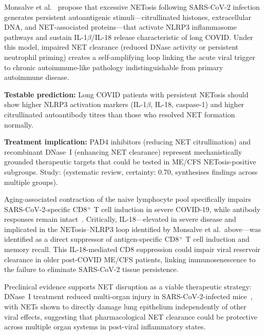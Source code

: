 \begin{hypothesis}
\label{hyp:monsalve2025-nets-autoimmunity}
Monsalve et al.~\cite{Monsalve2025} propose that excessive NETosis following SARS-CoV-2 infection generates persistent autoantigenic stimuli---citrullinated histones, extracellular DNA, and NET-associated proteins---that activate NLRP3 inflammasome pathways and sustain IL-1$\beta$/IL-18 release characteristic of long COVID. Under this model, impaired NET clearance (reduced DNase activity or persistent neutrophil priming) creates a self-amplifying loop linking the acute viral trigger to chronic autoimmune-like pathology indistinguishable from primary autoimmune disease.

\textbf{Testable prediction:} Long COVID patients with persistent NETosis should show higher NLRP3 activation markers (IL-1$\beta$, IL-18, caspase-1) and higher citrullinated autoantibody titres than those who resolved NET formation normally.

\textbf{Treatment implication:} PAD4 inhibitors (reducing NET citrullination) and recombinant DNase~I (enhancing NET clearance) represent mechanistically grounded therapeutic targets that could be tested in ME/CFS NETosis-positive subgroups.
Study: (systematic review, certainty: 0.70, synthesises findings across multiple groups).
\end{hypothesis}

Aging-associated contraction of the naive lymphocyte pool specifically impairs
SARS-CoV-2-specific CD8$^+$ T cell induction in severe COVID-19, while antibody
responses remain intact~\cite{Autaa2025CD8Aging}. Critically, IL-18---elevated in
severe disease and implicated in the NETosis--NLRP3 loop identified by Monsalve et al.\ above---was
identified as a direct suppressor of antigen-specific CD8$^+$ T cell induction and
memory recall. This IL-18-mediated CD8 suppression could impair viral reservoir
clearance in older post-COVID ME/CFS patients, linking immunosenescence to the
failure to eliminate SARS-CoV-2 tissue persistence.

Preclinical evidence supports NET disruption as a viable therapeutic strategy: DNase~I treatment reduced multi-organ injury in SARS-CoV-2-infected mice~\cite{Veras2023}, with NETs shown to directly damage lung epithelium independently of other viral effects, suggesting that pharmacological NET clearance could be protective across multiple organ systems in post-viral inflammatory states.

